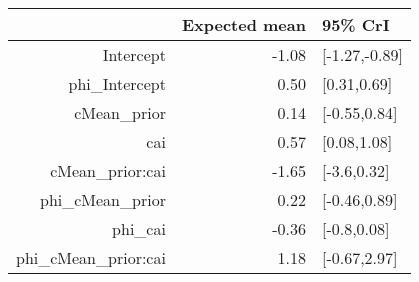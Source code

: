\begin{tabular}{rrl}
  \hline
 & Expected mean & 95\% CrI \\ 
  \hline
Intercept & -1.08 & [-1.27,-0.89] \\ 
  phi\_Intercept & 0.50 & [0.31,0.69] \\ 
  cMean\_prior & 0.14 & [-0.55,0.84] \\ 
  cai & 0.57 & [0.08,1.08] \\ 
  cMean\_prior:cai & -1.65 & [-3.6,0.32] \\ 
  phi\_cMean\_prior & 0.22 & [-0.46,0.89] \\ 
  phi\_cai & -0.36 & [-0.8,0.08] \\ 
  phi\_cMean\_prior:cai & 1.18 & [-0.67,2.97] \\ 
   \hline
\end{tabular}

